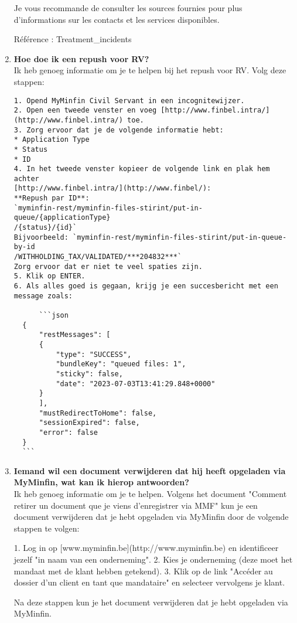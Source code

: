\begin{enumerate}
    Je vous recommande de consulter les sources fournies pour plus d'informations sur les contacts et les services disponibles.
    
    Référence : Treatment\_incidents
    
    
    \item \textbf{Hoe doe ik een repush voor RV?} \\
    
    Ik heb genoeg informatie om je te helpen bij het repush voor RV. Volg deze stappen:
    \begin{verbatim}
1. Opend MyMinfin Civil Servant in een incognitewijzer.
2. Open een tweede venster en voeg [http://www.finbel.intra/]
(http://www.finbel.intra/) toe.
3. Zorg ervoor dat je de volgende informatie hebt:
* Application Type
* Status
* ID
4. In het tweede venster kopieer de volgende link en plak hem achter 
[http://www.finbel.intra/](http://www.finbel/):
**Repush par ID**:
`myminfin-rest/myminfin-files-stirint/put-in-queue/{applicationType}
/{status}/{id}`
Bijvoorbeeld: `myminfin-rest/myminfin-files-stirint/put-in-queue-by-id
/WITHHOLDING_TAX/VALIDATED/***204832***`
Zorg ervoor dat er niet te veel spaties zijn.
5. Klik op ENTER.
6. Als alles goed is gegaan, krijg je een succesbericht met een message zoals:

      ```json
  {
      "restMessages": [
      {
          "type": "SUCCESS",
          "bundleKey": "queued files: 1",
          "sticky": false,
          "date": "2023-07-03T13:41:29.848+0000"
      }
      ],
      "mustRedirectToHome": false,
      "sessionExpired": false,
      "error": false
  }
  ```
    \end{verbatim}
    
    \item \textbf{Iemand wil een document verwijderen dat hij heeft opgeladen via MyMinfin, wat kan ik hierop antwoorden?} \\
    Ik heb genoeg informatie om je te helpen. Volgens het document "Comment retirer un document que je viens d'enregistrer via MMF" kun je een document verwijderen dat je hebt opgeladen via MyMinfin door de volgende stappen te volgen:
    
    1. Log in op [www.myminfin.be](http://www.myminfin.be) en identificeer jezelf "in naam van een onderneming".
    2. Kies je onderneming (deze moet het mandaat met de klant hebben getekend).
    3. Klik op de link "Accéder au dossier d'un client en tant que mandataire" en selecteer vervolgens je klant.
    
    Na deze stappen kun je het document verwijderen dat je hebt opgeladen via MyMinfin.
    

\end{enumerate}
